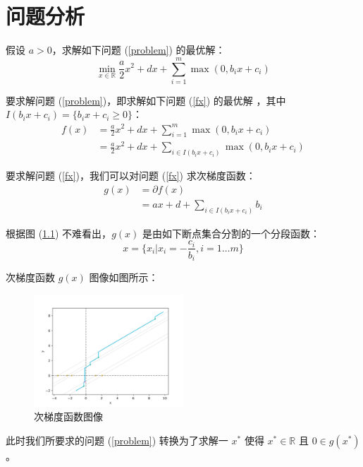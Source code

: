 
\chapter{问题分析}

假设 $a>0$，求解如下问题 (\ref{problem}) 的最优解：
\begin{equation}
  \min_{x\in\mathbb{R}}\frac{a}{2}x^2+dx+\sum^{m}_{i=1}\max(0,b_ix+c_i)\label{problem}
\end{equation}

要求解问题 (\ref{problem})，即求解如下问题 (\ref{fx}) 的最优解 \cite{10.1016/j.patcog.2017.02.006}，其中 $I(b_ix+c_i)=\{b_ix+c_i\ge0\}$：
\begin{align}
  f(x)
   & =\frac{a}{2}x^2+dx+\sum^{m}_{i=1}\max(0,b_ix+c_i)\nonumber           \\
   & =\frac{a}{2}x^2+dx+\sum_{i\in I(b_ix+c_i)}\max(0,b_ix+c_i)\label{fx}
\end{align}

要求解问题 (\ref{fx})，我们可以对问题 (\ref{fx}) 求次梯度函数：
\begin{align}
  g(x)
   & =\partial f(x)\nonumber                    \\
   & =ax+d+\sum_{i\in I(b_ix+c_i)}b_i\label{gx}
\end{align}

根据图 (\ref{SubGradient}) 不难看出，$g(x)$ 是由如下断点集合分割的一个分段函数：
\begin{equation}
  x=\{x_i|x_i=-\frac{c_i}{b_i},i=1\dots m\}\nonumber
\end{equation}

次梯度函数 $g(x)$ 图像如图所示：
\begin{figure}[htb]
  \centering
  \includegraphics[width=0.5\textwidth]{figures/SubGradient.png}
  \caption{次梯度函数图像}
  \label{SubGradient}
\end{figure}

此时我们所要求的问题 (\ref{problem}) 转换为了求解一 $x^*$ 使得 $x^*\in\mathbb{R}$ 且 $0\in g(x^*)$。